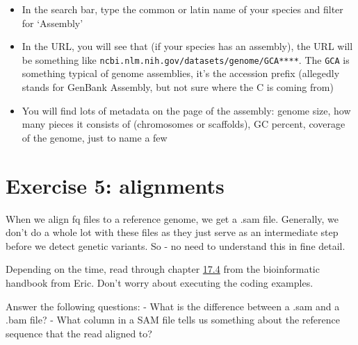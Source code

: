 \documentclass[
  letterpaper,
  DIV=11,
  numbers=noendperiod]{scrreprt}
\providecommand{\tightlist}{%
  \setlength{\itemsep}{0pt}\setlength{\parskip}{0pt}}\usepackage{longtable,booktabs,array}
\begin{document}
\begin{tcolorbox}[enhanced jigsaw, arc=.35mm, left=2mm, titlerule=0mm, rightrule=.15mm, colframe=quarto-callout-tip-color-frame, coltitle=black, colback=white, opacityback=0, bottomtitle=1mm, bottomrule=.15mm, colbacktitle=quarto-callout-tip-color!10!white, breakable, title=\textcolor{quarto-callout-tip-color}{\faLightbulb}\hspace{0.5em}{Tips}, toptitle=1mm, toprule=.15mm, opacitybacktitle=0.6, leftrule=.75mm]

\begin{itemize}
\tightlist
\item
  In the search bar, type the common or latin name of your species and
  filter for `Assembly'
\item
  In the URL, you will see that (if your species has an assembly), the
  URL will be something like
  \texttt{ncbi.nlm.nih.gov/datasets/genome/GCA****}. The \texttt{GCA} is
  something typical of genome assemblies, it's the accession prefix
  (allegedly stands for GenBank Assembly, but not sure where the C is
  coming from)
\item
  You will find lots of metadata on the page of the assembly: genome
  size, how many pieces it consists of (chromosomes or scaffolds), GC
  percent, coverage of the genome, just to name a few
\end{itemize}

\end{tcolorbox}

\section{Exercise 5: alignments}\label{exercise-5-alignments}

When we align fq files to a reference genome, we get a .sam file.
Generally, we don't do a whole lot with these files as they just serve
as an intermediate step before we detect genetic variants. So - no need
to understand this in fine detail.

Depending on the time, read through chapter
\href{https://eriqande.github.io/eca-bioinf-handbook/bioinformatic-file-formats.html\#sambamfiles}{17.4}
from the bioinformatic handbook from Eric. Don't worry about executing
the coding examples.

Answer the following questions: - What is the difference between a .sam
and a .bam file? - What column in a SAM file tells us something about
the reference sequence that the read aligned to?
\end{document}
